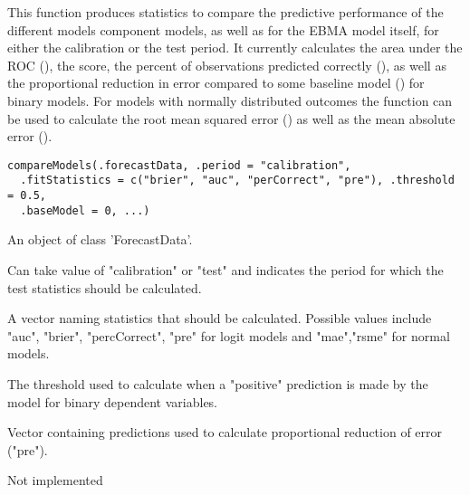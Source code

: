 \documentclass[a4paper]{book}
\begin{document}
%
\begin{Description}\relax
This function produces statistics to compare the predictive performance of the different models component models, as well as for the EBMA model itself, for either the calibration or the test period. It currently calculates the area under the ROC (), the  score, the percent of observations predicted correctly (), as well as the proportional reduction in error compared to some baseline model () for binary models. For models with normally distributed outcomes the  function can be used to calculate the root mean squared error () as well as the mean absolute error ().
\end{Description}
%
\begin{Usage}
\begin{verbatim}
compareModels(.forecastData, .period = "calibration",
  .fitStatistics = c("brier", "auc", "perCorrect", "pre"), .threshold = 0.5,
  .baseModel = 0, ...)
\end{verbatim}
\end{Usage}
%
\begin{Arguments}
\begin{ldescription}
\item[\code{.forecastData}] An object of class 'ForecastData'.

\item[\code{.period}] Can take value of "calibration" or "test" and indicates the period for which the test statistics should be calculated.

\item[\code{.fitStatistics}] A vector naming statistics that should be calculated.  Possible values include "auc", "brier", "percCorrect", "pre" for logit models and "mae","rsme" for normal models.

\item[\code{.threshold}] The threshold used to calculate when a "positive" prediction is made by the model for binary dependent variables.

\item[\code{.baseModel}] Vector containing predictions used to calculate proportional reduction of error ("pre").

\item[\code{...}] Not implemented
\end{ldescription}
\end{Arguments}
\end{document}
